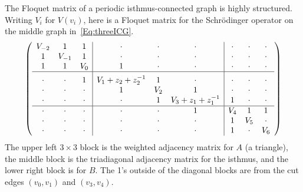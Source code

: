 \documentclass[12pt]{amsart}
\theoremstyle{remark}
\newcommand{\defcolor}[1]{{\color{blue}#1}}
\begin{document}
The Floquet matrix of a periodic isthmus-connected graph is highly structured.
Writing \defcolor{$V_i$} for $V(v_i)$, here is a Floquet matrix for the Schr\"odinger operator on the middle graph
in~\eqref{Eq:threeICG}. 
\[
\left( \begin{array}{ccc|ccc|ccc}
    V_{-2}&  1  & 1   &  \cdot & \cdot & \cdot & \cdot & \cdot & \cdot \\
      1  &V_{-1}& 1   &  \cdot & \cdot & \cdot & \cdot & \cdot & \cdot \\
     1   &  1  &V_0  & 1 & \cdot & \cdot & \cdot & \cdot & \cdot \\  \hline
    \cdot&\cdot &  1  &V_1+z_2+z_2^{-1}  &  1 & \cdot & \cdot & \cdot & \cdot\rule{0pt}{13pt}\\
    \cdot&\cdot &\cdot & 1  &V_2 & 1 & \cdot & \cdot & \cdot\\
    \cdot&\cdot &\cdot&\cdot& 1  &V_3+z_1+z_1^{-1} & 1 &\cdot&\cdot\rule[-4pt]{0pt}{5pt}\\\hline
    \cdot & \cdot & \cdot & \cdot & \cdot & 1 & V_4  & 1 & 1\\
    \cdot & \cdot & \cdot & \cdot & \cdot & \cdot & 1 & V_5& \cdot \\
    \cdot & \cdot & \cdot & \cdot & \cdot & \cdot & 1 & \cdot & V_6 \end{array}\right)
\]
The upper left $3\times 3$ block is the weighted adjacency matrix for $A$ (a triangle), the middle block is the
triadiagonal adjacency matrix for the isthmus, and  the lower right block is for
$B$.
The 1's outside of the diagonal blocks are from the cut edges $(v_0,v_1)$ and $(v_3,v_4)$.
\end{document}
